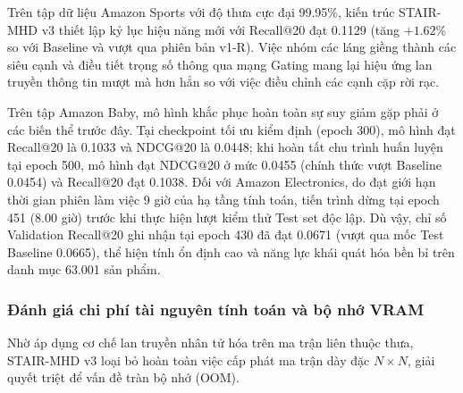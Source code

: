 Trên tập dữ liệu Amazon Sports với độ thưa cực đại 99.95\%, kiến trúc STAIR-MHD v3 thiết lập kỷ lục hiệu năng mới với Recall@20 đạt 0.1129 (tăng $+1.62\%$ so với Baseline và vượt qua phiên bản v1-R). Việc nhóm các láng giềng thành các siêu cạnh và điều tiết trọng số thông qua mạng Gating mang lại hiệu ứng lan truyền thông tin mượt mà hơn hẳn so với việc điều chỉnh các cạnh cặp rời rạc.

Trên tập Amazon Baby, mô hình khắc phục hoàn toàn sự suy giảm gặp phải ở các biến thể trước đây. Tại checkpoint tối ưu kiểm định (epoch 300), mô hình đạt Recall@20 là 0.1033 và NDCG@20 là 0.0448; khi hoàn tất chu trình huấn luyện tại epoch 500, mô hình đạt NDCG@20 ở mức 0.0455 (chính thức vượt Baseline 0.0454) và Recall@20 đạt 0.1038. Đối với Amazon Electronics, do đạt giới hạn thời gian phiên làm việc 9 giờ của hạ tầng tính toán, tiến trình dừng tại epoch 451 (8.00 giờ) trước khi thực hiện lượt kiểm thử Test set độc lập. Dù vậy, chỉ số Validation Recall@20 ghi nhận tại epoch 430 đã đạt 0.0671 (vượt qua mốc Test Baseline 0.0665), thể hiện tính ổn định cao và năng lực khái quát hóa bền bỉ trên danh mục 63.001 sản phẩm.

\subsubsection{Đánh giá chi phí tài nguyên tính toán và bộ nhớ VRAM}

Nhờ áp dụng cơ chế lan truyền nhân tử hóa trên ma trận liên thuộc thưa, STAIR-MHD v3 loại bỏ hoàn toàn việc cấp phát ma trận dày đặc $N \times N$, giải quyết triệt để vấn đề tràn bộ nhớ (OOM).

\begin{table}[H]
\centering
\small
\setlength{\tabcolsep}{6pt}
\renewcommand{\arraystretch}{1.2}
\caption{Mức tiêu thụ VRAM tensor đỉnh và thời gian huấn luyện thực tế của STAIR-MHD v3.}
\label{tab:stair_mhd_hardware}
\end{table}

